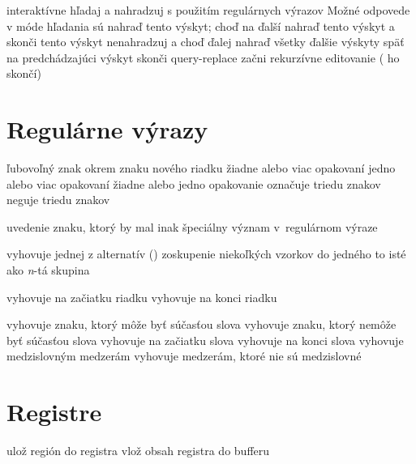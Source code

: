  interaktívne hľadaj a nahradzuj
 s použitím regulárnych výrazov
\askip
Možné odpovede v móde hľadania sú
\askip
{} nahraď tento výskyt; choď na ďalší
\key{,} nahraď tento výskyt a skonči
 tento výskyt nenahradzuj a choď ďalej
\key{!} nahraď všetky ďalšie výskyty
\key{\^{}} späť na predchádzajúci výskyt
 skonči query-replace
 začni rekurzívne editovanie ( ho skončí)

\section{Regulárne výrazy}

 ľubovoľný znak okrem znaku nového riadku
\key{*} žiadne alebo viac opakovaní
\key{+} jedno alebo viac opakovaní
 žiadne alebo jedno opakovanie
\key{[$\ldots$]} označuje triedu znakov
\key{[\^{}$\ldots$]} neguje triedu znakov

 uvedenie znaku, ktorý by mal inak špeciálny význam
v~regulárnom výraze

\key{$\ldots$\\|$\ldots$\\|$\ldots$} vyhovuje jednej z alternatív ()
\key{\\( $\ldots$ \\)} zoskupenie niekoľkých vzorkov do jedného
 to isté ako {\it n\/}-tá skupina

\key{\^{}} vyhovuje na začiatku riadku
\key{\$} vyhovuje na konci riadku

\key{\\w} vyhovuje znaku, ktorý môže byť súčasťou slova
\key{\\W} vyhovuje znaku, ktorý nemôže byť súčasťou slova
\key{\\<} vyhovuje na začiatku slova
\key{\\>} vyhovuje na konci slova
\key{\\b} vyhovuje medzislovným medzerám
\key{\\B} vyhovuje medzerám, ktoré nie sú medzislovné

\section{Registre}

 ulož región do registra
 vlož obsah registra do bufferu

